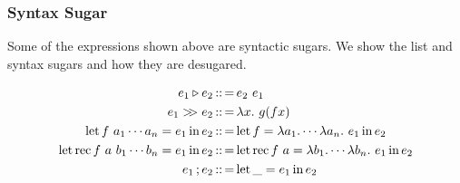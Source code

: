 \subsubsection{Syntax Sugar}
Some of the expressions shown above are syntactic sugars.
We show the list and syntax sugars and how they are desugared.

\begin{align*}
        e_1 \triangleright e_2 &\defeq e_2\ e_1 \\
        e_1 \composition e_2 &\defeq \abs{x}{g (f x)}\\
        \letStructure{f\ a_{1} \cdots a_n}{e_1}{e_2}&\defeq
            \letStructure{f}{\lambda a_1 . \cdots \lambda a_n.\ {e_1}}{e_2}\\
        \letRecStructure{f}{a\ b_{1} \cdots b_n}{e_1}{e_2}&\defeq
            \letRecStructure{f}{a}{\lambda b_1 . \cdots \lambda b_n.\ {e_1}}{e_2}\\
        e_1\opCol{}e_2 &\defeq \letStructure{\_}{e_1}{e_2}
\end{align*}
